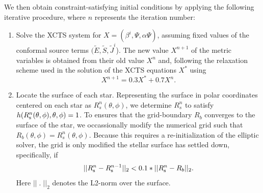\documentclass[aps,prd,amsmath,floatfix
,twocolumn
,superscriptaddress,nofootinbib,showpacs]{revtex4-1}
\theoremstyle{plain} \newtheorem{thm}{Theorem} \newtheorem{lem}{Lemma}
\newcommand{\red}[1]{\textcolor{Red}{#1}}
\newcommand{\nick}[1]{\textcolor{blue}{\textit{Nick: #1}}}
\begin{document}
We then obtain constraint-satisfying initial conditions by applying
the following iterative procedure, where $n$ represents the iteration number:
\begin{enumerate}
\item \label{step:1} 
  Solve the XCTS system for $X=(\beta^i,\Psi,\alpha \Psi)$,
  assuming fixed values of the conformal source terms
  $(\tilde{E},\tilde{S},\tilde{J}^i$). The new value $X^{n+1}$ of the
  metric variables is obtained from their old value $X^n$ and,
  following the relaxation scheme used in \cite{FoucartEtAl:2008} the
  solution of the XCTS equations $X^*$ using
\begin{equation}
\label{eq:Relaxation}
X^{n+1}=0.3X^*+0.7X^n.
\end{equation}
\item Locate the surface of each star.  Representing the surface in polar coordinates centered on each star as $R_s^n(\theta,\phi)$, we determine $R_s^n$ to satisfy~\cite{FoucartEtAl:2008} $h(R^n_{\rm
  s}(\theta,\phi),\theta,\phi)=1$.
To ensures that the grid-boundary $R_b$ converges to the surface of the star, we occassionally modify the numerical grid such that $R_b(\theta,\phi)=R^n_s(\theta,\phi)$.  Because this requires a re-initialization of the elliptic solver, the grid is only modified the stellar surface has settled down, specifically, if
\begin{equation}
||R^n_{\rm s} - R^{n-1}_{\rm s}||_2 < 0.1*||R^n_{\rm s} - R_b||_2.
\end{equation}
Here $||\;.\;||_2$ denotes the L2-norm over the surface.


\end{enumerate}
\end{document}
